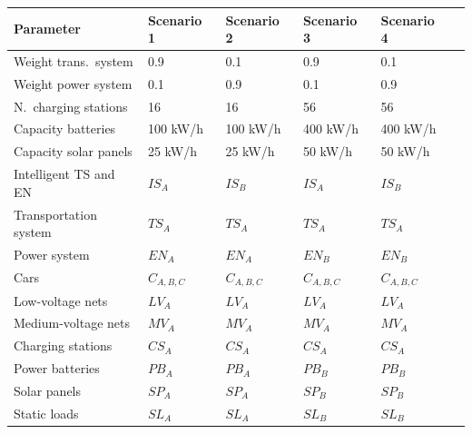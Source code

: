 \begin{table}[h]
	\renewcommand{\arraystretch}{1.3}
	\label{tab:example1}
	\centering
	\begin{tabularx}{\columnwidth}{Xlllll}
		\hline
		\textbf{Parameter}                    & \textbf{Scenario 1}    & \textbf{Scenario 2} & \textbf{Scenario 3} & \textbf{Scenario 4}\\ \hline
		Weight trans.\ system 			& 0.9	      & 0.1  	& 0.9	& 0.1\\
		Weight power system 			& 0.1	      & 0.9  	& 0.1	& 0.9\\
		N.\ charging stations              & 16         & 16 		& 56	& 56\\
		Capacity batteries          & 100 kW/h         & 100 kW/h 		& 400 kW/h		& 400 kW/h\\
		Capacity solar panels               & 25 kW/h         & 25 kW/h 		& 50 kW/h		& 50 kW/h	\\ \hline
		Intelligent TS and EN                 & $IS_{A}$         & $IS_{B}$ 		& $IS_{A}$		& $IS_{B}$	\\ 
		Transportation system                 & $TS_{A}$         & $TS_{A}$ 		& $TS_{A}$		& $TS_{A}$	\\ 
		Power system                & $EN_{A}$         & $EN_{A}$ 		& $EN_{B}$		& $EN_{B}$	\\ 
		Cars                  & $C_{A,B,C}$          & $C_{A,B,C}$		& $C_{A,B,C}$		& $C_{A,B,C}$	\\ 
		Low-voltage nets                 & $LV_{A}$         & $LV_{A}$ 		& $LV_{A}$		& $LV_{A}$	\\ 
		Medium-voltage nets                 & $MV_{A}$         & $MV_{A}$ 		& $MV_{A}$		& $MV_{A}$	\\ 
		Charging stations                 & $CS_{A}$         & $CS_{A}$ 		& $CS_{A}$		& $CS_{A}$	\\ 
		Power batteries                & $PB_{A}$         & $PB_{A}$ 		& $PB_{B}$		& $PB_{B}$	\\ 
		Solar panels                 & $SP_{A}$         & $SP_{A}$ 		& $SP_{B}$		& $SP_{B}$	\\ 
		Static loads                 & $SL_{A}$         & $SL_{A}$ 		& $SL_{B}$		& $SL_{B}$	\\ \hline
	\end{tabularx}
\end{table}

